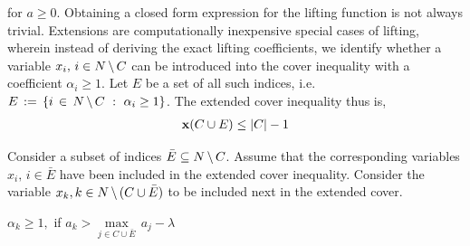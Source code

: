 \documentclass[10pt,twoside]{amsart}
\begin{document}
for $a \geq 0$. Obtaining a closed form expression for the lifting function is not always trivial. Extensions are computationally inexpensive special cases of lifting, wherein instead of deriving the exact lifting coefficients, we identify whether a variable $x_i,\,i\in N\,\backslash\, C$ can be introduced into the cover inequality with a coefficient $\alpha_i \geq 1$. Let $E$ be a set of all such indices, i.e. $E \,:=\, \left\{ {i\,\in\, N\,\backslash\, C} \ : \ {\alpha_i \geq 1} \right\}$. The extended cover inequality thus is,
\begin{align}
        \mathbf{x}(C\cup E) \leq |C| - 1 \label{ineq:extdcover}
\end{align}
%

Consider a subset of indices $\bar{E} \subseteq N\,\backslash\, C$. Assume that the corresponding variables $x_i,\,i\in \bar{E}$ have been included in the extended cover inequality. Consider the variable $x_k, k \in N\,\backslash\, (C\cup \bar{E})$ to be included next in the extended cover.
\begin{prop}
  $\alpha_k \geq 1,$ if $a_k > \underset{j\in C\cup \bar{E}}{\max}\, a_j - \lambda$
\end{prop}
%
\end{document}
